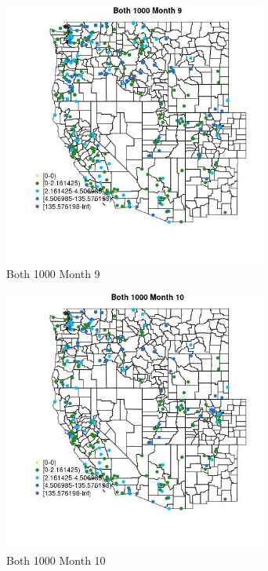 \begin{figure} 
\centering  
\includegraphics[width=0.77\textwidth]{Code_Outputs/Report_ML_input_PM25_Step4_part_e_de_duplicated_aveswNAs_MapObsMo9Both_1000.jpg} 
\caption{\label{fig:Report_ML_input_PM25_Step4_part_e_de_duplicated_aveswNAsMapObsMo9Both_1000}Both 1000 Month 9} 
\end{figure} 
 

\begin{figure} 
\centering  
\includegraphics[width=0.77\textwidth]{Code_Outputs/Report_ML_input_PM25_Step4_part_e_de_duplicated_aveswNAs_MapObsMo10Both_1000.jpg} 
\caption{\label{fig:Report_ML_input_PM25_Step4_part_e_de_duplicated_aveswNAsMapObsMo10Both_1000}Both 1000 Month 10} 
\end{figure} 
 

